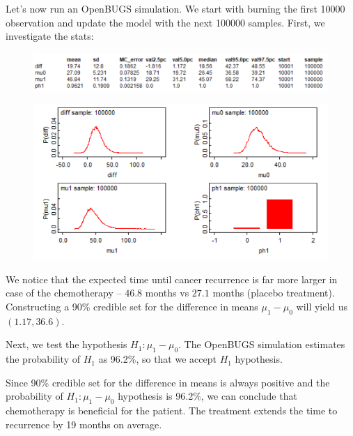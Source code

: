 \documentclass[a4 paper]{article}
\begin{document}
Let's now run an OpenBUGS simulation. We start 
with burning 
the first 10000 observation and update the model 
with the next 100000 samples. First, 
we investigate the stats:

\begin{figure}[H]
	\includegraphics[scale=1.0]{q2}
	\centering
	\label{q2}
\end{figure}



\begin{figure}[H]
	\includegraphics[scale=1.0]{q2_2}
	\centering
	\label{q2_2}
\end{figure}




We notice that the expected time until 
cancer recurrence is far more 
larger in case of the chemotherapy --
$46.8$ months vs $27.1$ months (placebo 
treatment). Constructing 
a 90\% credible set for the difference
in means $\mu_1-\mu_0$
will yield us $(1.17, 36.6)$. 

Next, we test the hypothesis 
$H_1: \mu_1-\mu_0$. The OpenBUGS 
simulation estimates the probability 
of $H_1$ as 96.2\%, so that we 
accept $H_1$ hypothesis. 




Since 90\% credible set for the difference
in means is always positive 
and the probability 
of $H_1: \mu_1-\mu_0$ hypothesis is 96.2\%, we can conclude 
that chemotherapy is beneficial for the 
patient. The treatment extends the time
to recurrence by 19 months on average.  \\
\end{document}

